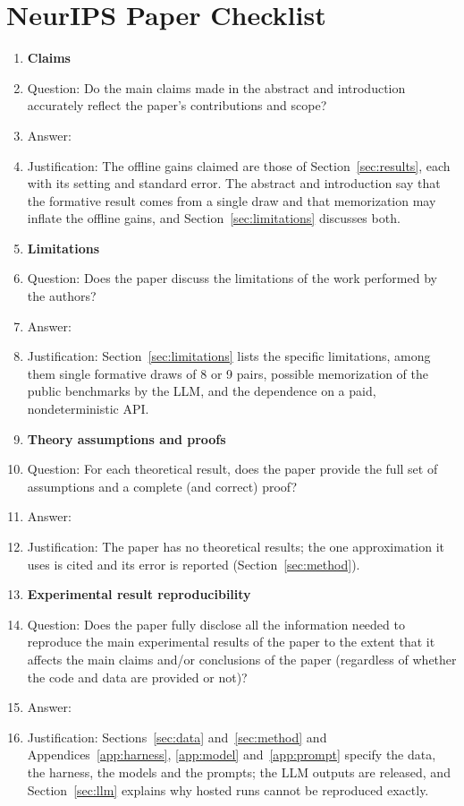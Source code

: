 \section*{NeurIPS Paper Checklist}

\begin{enumerate}

\item {\bf Claims}
  \item[] Question: Do the main claims made in the abstract and introduction accurately reflect the paper's contributions and scope?
  \item[] Answer: \answerYes{}
  \item[] Justification: The offline gains claimed are those of Section~\ref{sec:results}, each with its setting and standard error. The abstract and introduction say that the formative result comes from a single draw and that memorization may inflate the offline gains, and Section~\ref{sec:limitations} discusses both.

\item {\bf Limitations}
  \item[] Question: Does the paper discuss the limitations of the work performed by the authors?
  \item[] Answer: \answerYes{}
  \item[] Justification: Section~\ref{sec:limitations} lists the specific limitations, among them single formative draws of 8 or 9 pairs, possible memorization of the public benchmarks by the LLM, and the dependence on a paid, nondeterministic API.

\item {\bf Theory assumptions and proofs}
  \item[] Question: For each theoretical result, does the paper provide the full set of assumptions and a complete (and correct) proof?
  \item[] Answer: \answerNA{}
  \item[] Justification: The paper has no theoretical results; the one approximation it uses is cited and its error is reported (Section~\ref{sec:method}).

\item {\bf Experimental result reproducibility}
  \item[] Question: Does the paper fully disclose all the information needed to reproduce the main experimental results of the paper to the extent that it affects the main claims and/or conclusions of the paper (regardless of whether the code and data are provided or not)?
  \item[] Answer: \answerYes{}
  \item[] Justification: Sections~\ref{sec:data} and~\ref{sec:method} and Appendices~\ref{app:harness}, \ref{app:model} and~\ref{app:prompt} specify the data, the harness, the models and the prompts; the LLM outputs are released, and Section~\ref{sec:llm} explains why hosted runs cannot be reproduced exactly.


\end{enumerate}
